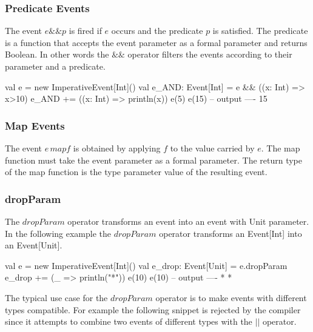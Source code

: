 \documentclass[10pt,a4paper]{article}
\newcommand{\code}[1]{{\fontfamily{cmtt}\small\selectfont#1}}
\begin{document}
\subsubsection{Predicate Events}

The event $e \&\& p$ is fired if $e$ occurs and the predicate $p$ is
satisfied. The predicate is a function that accepts the event
parameter as a formal parameter and returns \code{Boolean}. In other
words the $\&\&$ operator filters the events according to their
parameter and a predicate.

\begin{codenv}
val e = new ImperativeEvent[Int]()
val e_AND: Event[Int] = e && ((x: Int) => x>10)
e_AND += ((x: Int) => println(x))
e(5)
e(15)
-- output ----
15
\end{codenv}


\subsubsection{Map Events}

The event $e\,map f$ is obtained by applying $f$ to the value carried
by $e$. The map function must take the event parameter as a formal
parameter. The return type of the map function is the type parameter
value of the resulting event.





\subsubsection{dropParam}

The $dropParam$ operator transforms an event into an event with
\code{Unit} parameter. In the following example the $dropParam$
operator transforms an \code{Event[Int]} into an \code{Event[Unit]}.

\begin{codenv}
val e = new ImperativeEvent[Int]()
val e_drop: Event[Unit] = e.dropParam
e_drop += (_ => println("*"))
e(10)
e(10)
-- output ----
*
*
\end{codenv}

The typical use case for the $dropParam$ operator is to make events
with different types compatible. For example the following snippet is
rejected by the compiler since it attempts to combine two events of
different types with the $||$ operator.
\end{document}
